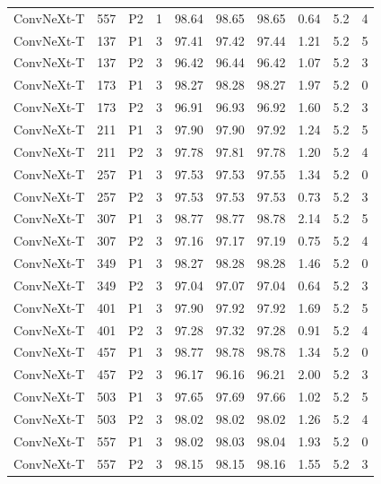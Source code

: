 {\begin{longtable}{lrllrrrrrr}
ConvNeXt-T & 557 & P2 & 1 & 98.64 & 98.65 & 98.65 & 0.64 & 5.2 & 4 \\
ConvNeXt-T & 137 & P1 & 3 & 97.41 & 97.42 & 97.44 & 1.21 & 5.2 & 5 \\
ConvNeXt-T & 137 & P2 & 3 & 96.42 & 96.44 & 96.42 & 1.07 & 5.2 & 3 \\
ConvNeXt-T & 173 & P1 & 3 & 98.27 & 98.28 & 98.27 & 1.97 & 5.2 & 0 \\
ConvNeXt-T & 173 & P2 & 3 & 96.91 & 96.93 & 96.92 & 1.60 & 5.2 & 3 \\
ConvNeXt-T & 211 & P1 & 3 & 97.90 & 97.90 & 97.92 & 1.24 & 5.2 & 5 \\
ConvNeXt-T & 211 & P2 & 3 & 97.78 & 97.81 & 97.78 & 1.20 & 5.2 & 4 \\
ConvNeXt-T & 257 & P1 & 3 & 97.53 & 97.53 & 97.55 & 1.34 & 5.2 & 0 \\
ConvNeXt-T & 257 & P2 & 3 & 97.53 & 97.53 & 97.53 & 0.73 & 5.2 & 3 \\
ConvNeXt-T & 307 & P1 & 3 & 98.77 & 98.77 & 98.78 & 2.14 & 5.2 & 5 \\
ConvNeXt-T & 307 & P2 & 3 & 97.16 & 97.17 & 97.19 & 0.75 & 5.2 & 4 \\
ConvNeXt-T & 349 & P1 & 3 & 98.27 & 98.28 & 98.28 & 1.46 & 5.2 & 0 \\
ConvNeXt-T & 349 & P2 & 3 & 97.04 & 97.07 & 97.04 & 0.64 & 5.2 & 3 \\
ConvNeXt-T & 401 & P1 & 3 & 97.90 & 97.92 & 97.92 & 1.69 & 5.2 & 5 \\
ConvNeXt-T & 401 & P2 & 3 & 97.28 & 97.32 & 97.28 & 0.91 & 5.2 & 4 \\
ConvNeXt-T & 457 & P1 & 3 & 98.77 & 98.78 & 98.78 & 1.34 & 5.2 & 0 \\
ConvNeXt-T & 457 & P2 & 3 & 96.17 & 96.16 & 96.21 & 2.00 & 5.2 & 3 \\
ConvNeXt-T & 503 & P1 & 3 & 97.65 & 97.69 & 97.66 & 1.02 & 5.2 & 5 \\
ConvNeXt-T & 503 & P2 & 3 & 98.02 & 98.02 & 98.02 & 1.26 & 5.2 & 4 \\
ConvNeXt-T & 557 & P1 & 3 & 98.02 & 98.03 & 98.04 & 1.93 & 5.2 & 0 \\
ConvNeXt-T & 557 & P2 & 3 & 98.15 & 98.15 & 98.16 & 1.55 & 5.2 & 3 \\
\end{longtable}
}
